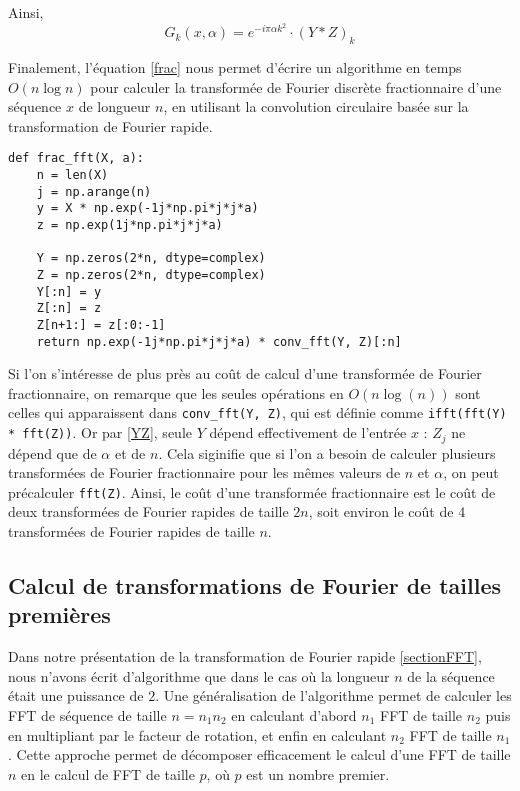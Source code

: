 \documentclass{article}
\begin{document}
Ainsi, 
\begin{equation}
  G_k(x, \alpha) = e^{-i\pi \alpha k^2 } \cdot (Y * Z)_k
  \label{frac}
\end{equation}

Finalement, l'équation \eqref{frac} nous permet d'écrire un algorithme en temps $O(n\log n)$ pour calculer la transformée de Fourier discrète fractionnaire d'une séquence $x$ de longueur $n$, en utilisant la convolution circulaire basée sur la transformation de Fourier rapide.
\begin{verbatim}
def frac_fft(X, a):
    n = len(X)
    j = np.arange(n)
    y = X * np.exp(-1j*np.pi*j*j*a)
    z = np.exp(1j*np.pi*j*j*a)
    
    Y = np.zeros(2*n, dtype=complex)
    Z = np.zeros(2*n, dtype=complex)
    Y[:n] = y
    Z[:n] = z
    Z[n+1:] = z[:0:-1]
    return np.exp(-1j*np.pi*j*j*a) * conv_fft(Y, Z)[:n]
\end{verbatim}

Si l'on s'intéresse de plus près au coût de calcul d'une transformée de Fourier fractionnaire, on remarque que les seules opérations en $O(n\log(n))$ sont celles qui apparaissent dans \texttt{conv_fft(Y, Z)}, qui est définie comme \texttt{ifft(fft(Y) * fft(Z))}.
Or par \eqref{YZ}, seule $Y$ dépend effectivement de l'entrée $x$ : $Z_j$ ne dépend que de $\alpha$ et de $n$. Cela siginifie que si l'on a besoin de calculer plusieurs transformées de Fourier fractionnaire pour les mêmes valeurs de $n$ et $\alpha$, on peut précalculer \texttt{fft(Z)}. 
Ainsi, le coût d'une transformée fractionnaire est le coût de deux transformées de Fourier rapides de taille $2n$, soit environ le coût de 4 transformées de Fourier rapides de taille $n$. 
\subsection{Calcul de transformations de Fourier de tailles premières}

Dans notre présentation de la transformation de Fourier rapide \ref{sectionFFT}, nous n'avons écrit d'algorithme que dans le cas où la longueur $n$ de la séquence était une puissance de $2$. 
Une généralisation de l'algorithme \cite{FFT} permet de calculer les FFT de séquence de taille $n=n_1n_2$ en calculant d'abord $n_1$ FFT de taille $n_2$ puis en multipliant par le facteur de rotation, et enfin en calculant $n_2$ FFT de taille $n_1$. 
Cette approche permet de décomposer efficacement le calcul d'une FFT de taille $n$ en le calcul de FFT de taille $p$, où $p$ est un nombre premier. 
\end{document}
